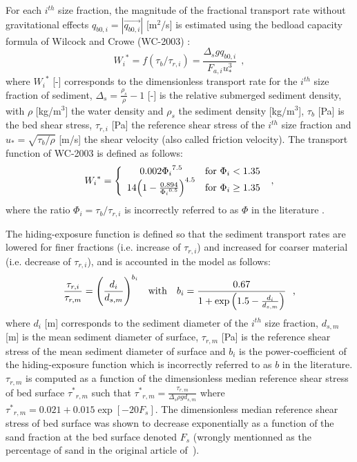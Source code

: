 For each $i^{th}$ size fraction, the magnitude of the fractional transport rate without gravitational effects $q_{b0,i}=|\vec{q_{b0,i}}|$ [m$^2$/s] is estimated using the bedload capacity formula of Wilcock and Crowe (WC-2003) \cite{Wilcock2003}:
\begin{equation}
{W_i}^*=f(\tau_b/\tau_{r,i})=\frac{\Delta_s gq_{b0,i}}{F_{a,i}u_*^3}~~,
\label{eq:Wilcock_similarity}
\end{equation}
where ${W_i}^*$ [-] corresponds to the dimensionless transport rate for the $i^{th}$ size fraction of sediment, $\Delta_s=\frac{\rho_s}{\rho}-1$ [-] is the relative submerged sediment density, with $\rho$ [kg/m$^3$] the water density and $\rho_s$ the sediment density [kg/m$^3$], $\tau_b$ [Pa] is the bed shear stress, $\tau_{r,i}$ [Pa] the reference shear stress of the $i^{th}$ size fraction and $u_*=\sqrt{\tau_b/\rho}$ [m/s] the shear velocity (also called friction velocity).
The transport function of WC-2003 is defined as follows:
\begin{equation}
{W_i}^*=
\left\lbrace
\begin{array}{cr}
0.002{\Phi_i}^{7.5} & \textnormal{for~} {\Phi_i}<1.35 \\
14{\Big(1-\frac{0.894}{{\Phi_i}^{0.5}} \Big)}^{4.5}& \textnormal{for~} {\Phi_i}\geq 1.35 \\
\end{array}
\right.~,
\label{eq:Wilcock_Transport}
\end{equation}
where the ratio ${\Phi_i}=\tau_b/\tau_{r,i}$ is incorrectly referred to as $\Phi$ in the literature \cite{Wilcock2003,Recking2015}.

The hiding-exposure function is defined so that the sediment transport rates are lowered for finer fractions ({i.e.} increase of $\tau_{r,i}$) and increased for coarser material ({i.e.} decrease of $\tau_{r,i}$), and is accounted in the model as follows:
\begin{equation}
\frac{\tau_{r,i}}{\tau_{r,m}}={\Bigg(\frac{d_i}{d_{s,m}}\Bigg)}^{b_i} \textnormal{~~~with~~~} b_i=\frac{0.67}{1+\exp{\Big( 1.5-\frac{d_i}{d_{s,m}}\Big)}}\textnormal{~~,}
\end{equation}
where $d_i$ [m] corresponds to the sediment diameter of the $i^{th}$ size fraction, $d_{s,m}$ [m] is the mean sediment diameter of surface, $\tau_{r,m}$ [Pa] is the reference shear stress of the mean sediment diameter of surface and $b_i$ is the power-coefficient of the hiding-exposure function which is incorrectly referred to as $b$ in the literature.
$\tau_{r,m}$ is computed as a function of the dimensionless median reference shear stress of bed surface ${\tau^*}_{r,m}$ such that ${\tau^*}_{r,m}=\frac{\tau_{r,m}}{\Delta_s\rho gd_{s,m}}$ where ${\tau^*}_{r,m}=0.021+0.015\exp[-20F_s]$. The dimensionless median reference shear stress of bed surface was shown to decrease exponentially as a function of the sand fraction at the bed surface denoted $F_s$ (wrongly mentionned as the percentage of sand in the original article of~\cite{Wilcock2003}).

